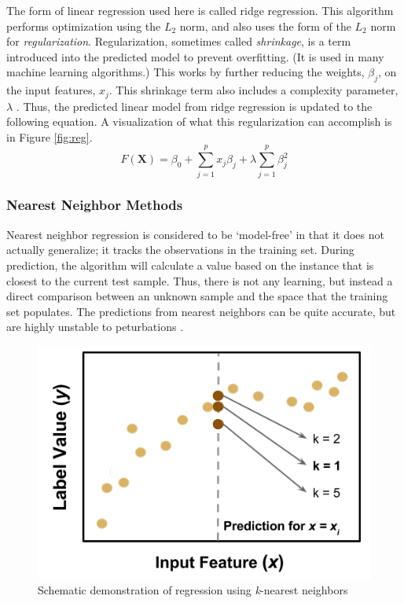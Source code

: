 The form of linear regression used here is called ridge regression. This
algorithm performs optimization using the $L_2$ norm, and also uses the form of
the $L_2$ norm for \textit{regularization}. Regularization, sometimes called
\textit{shrinkage}, is a term introduced into the predicted model to prevent
overfitting. (It is used in many machine learning algorithms.) This works by
further reducing the weights, $\beta_j$, on the input features, $x_j$. This
shrinkage term also includes a complexity parameter, $\lambda$
\cite{elements_stats}.  Thus, the predicted linear model from ridge regression
is updated to the following equation.  A visualization of what this
regularization can accomplish is in Figure \ref{fig:reg}.
\begin{equation}
  F(\boldsymbol{X}) = \beta_{0} +  \sum_{j=1}^{p} x_{j} \beta_{j} + \lambda \sum_{j=1}^{p} \beta_{j}^2
\end{equation}

\subsubsection{Nearest Neighbor Methods}
\label{sec:neighbor}

Nearest neighbor regression is considered to be `model-free' in that it does
not actually generalize; it tracks the observations in the training set.
During prediction, the algorithm will calculate a value based on the instance
that is closest to the current test sample. Thus, there is not any learning,
but instead a direct comparison between an unknown sample and the space that
the training set populates. The predictions from nearest neighbors can be quite
accurate, but are highly unstable to peturbations \cite{elements_stats}.  

\begin{figure}[!htb]
  \centering
  \includegraphics[width=0.8\linewidth]{./chapters/litrev/nn-fig.png}
  \caption{Schematic demonstration of regression using \textit{k}-nearest neighbors}
  \label{fig:nn}
\end{figure}

